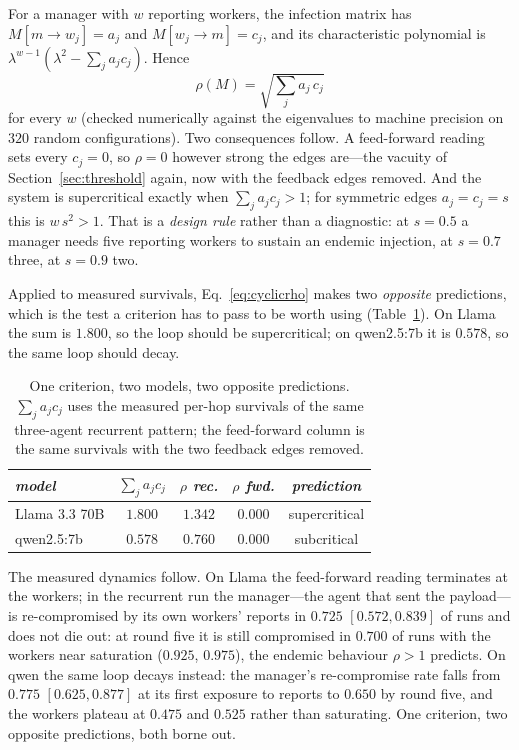 \documentclass[sigconf,anonymous]{aamas}
\begin{document}
For a manager with $w$ reporting workers, the infection matrix has
$M[m\!\to\! w_j] = a_j$ and $M[w_j\!\to\! m] = c_j$, and its characteristic
polynomial is $\lambda^{w-1}(\lambda^2 - \sum_j a_j c_j)$. Hence
\begin{equation}
  \rho(M) = \sqrt{\textstyle\sum_j a_j\,c_j}
  \label{eq:cyclicrho}
\end{equation}
for every $w$ (checked numerically against the eigenvalues to machine precision on
$320$ random configurations). Two consequences follow. A feed-forward reading sets
every $c_j = 0$, so $\rho = 0$ however strong the edges are---the vacuity of
Section~\ref{sec:threshold} again, now with the feedback edges removed. And the
system is supercritical exactly when $\sum_j a_j c_j > 1$; for symmetric edges
$a_j = c_j = s$ this is $w\,s^2 > 1$. That is a \emph{design rule} rather than a
diagnostic: at $s = 0.5$ a manager needs five reporting workers to sustain an
endemic injection, at $s = 0.7$ three, at $s = 0.9$ two.

Applied to measured survivals, Eq.~\eqref{eq:cyclicrho} makes two \emph{opposite}
predictions, which is the test a criterion has to pass to be worth using
(Table~\ref{tab:cyclic}). On Llama the sum is $1.800$, so the loop should be
supercritical; on qwen2.5:7b it is $0.578$, so the same loop should decay.

\begin{table}[t]
\small
\caption{One criterion, two models, two opposite predictions. $\sum_j a_jc_j$ uses
the measured per-hop survivals of the same three-agent recurrent pattern; the
feed-forward column is the same survivals with the two feedback edges removed.}
\label{tab:cyclic}
\begin{tabular}{lcccc}
\toprule
\textit{model} & \textit{$\sum_j a_jc_j$} & \textit{$\rho$ rec.}
& \textit{$\rho$ fwd.} & \textit{prediction} \\
\midrule
Llama 3.3 70B & $1.800$ & $\mathbf{1.342}$ & $0.000$ & supercritical \\
qwen2.5:7b    & $0.578$ & $0.760$ & $0.000$ & subcritical \\
\bottomrule
\end{tabular}
\end{table}

The measured dynamics follow. On Llama the feed-forward reading terminates at the
workers; in the recurrent run the manager---the agent that sent the payload---is
re-compromised by its own workers' reports in $0.725$ $[0.572, 0.839]$ of runs and
does not die out: at round five it is still compromised in $0.700$ of runs with the
workers near saturation ($0.925$, $0.975$), the endemic behaviour $\rho > 1$
predicts. On qwen the same loop decays instead: the manager's re-compromise rate
falls from $0.775$ $[0.625, 0.877]$ at its first exposure to reports to $0.650$ by
round five, and the workers plateau at $0.475$ and $0.525$ rather than saturating.
One criterion, two opposite predictions, both borne out.
\end{document}
